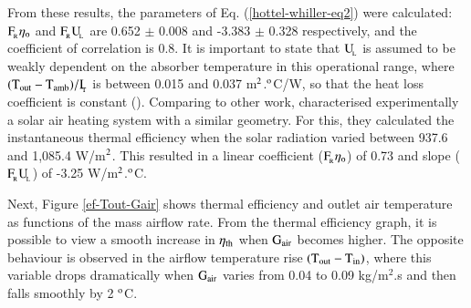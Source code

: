From these results, the parameters of Eq. (\ref{hottel-whiller-eq2}) were calculated: $\rm{F_{\!_R}}\eta_{\rm{o}}$ and $\rm{F_{\!_R}{U_{\!_L}}}$ are 0.652 $\pm$ 0.008 and -3.383 $\pm$ 0.328 respectively, and the coefficient of correlation is 0.8. It is important to state that $\rm{U_{\!_L}}$ is assumed to be weakly dependent on the absorber temperature in this operational range, where $\rm{(T_{out} - T_{amb})/I_{\!_T}}$ is between 0.015 and 0.037 m$^{\rm{2}}$.$^{\rm{o}}$C/W, so that the heat loss coefficient is constant (\cite{Rabl1985}). Comparing to other work, \citet{Shams2016} characterised experimentally a solar air heating system with a similar geometry. For this, they calculated the instantaneous thermal efficiency when the solar radiation varied between 937.6 and 1,085.4 W/m$^{\rm{2}}$. This resulted in a linear coefficient ($\rm{F_{\!_R}}\eta_{\rm{o}}$) of 0.73 and slope ($\rm{F_{\!_R}{U_{\!_L}}}$) of -3.25 W/m$^{\rm{2}}$.$^{\rm{o}}$C.

Next, Figure \ref{ef-Tout-Gair} shows thermal efficiency and outlet air temperature as functions of the mass airflow rate. From the thermal efficiency graph, it is possible to view a smooth increase in $\eta_{\rm{th}}$ when $\rm{G_{air}}$ becomes higher. The opposite behaviour is observed in the airflow temperature rise $(\rm{T_{out}} - \rm{T_{in}})$, where this variable drops dramatically when $\rm{G_{air}}$ varies from 0.04 to 0.09 kg/m$^2$.s and then falls smoothly by 2 $^{\rm{o}}$C.



